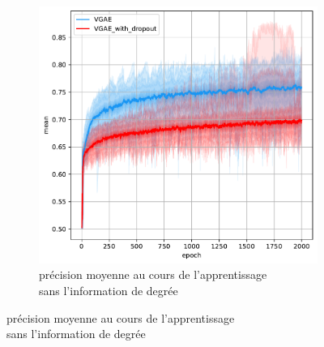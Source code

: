 \documentclass{article}
\begin{document}
\begin{figure}
\begin{subfigure}{0.45\textwidth}
      \includegraphics[width=\textwidth]{graphics/APs_no_degree_dropout_cinf.svg.pdf}
      \centering
      \caption{précision moyenne au cours de l'apprentissage\\ sans l'information de degrée}
    \end{subfigure}
    

\end{figure}
\end{document}
